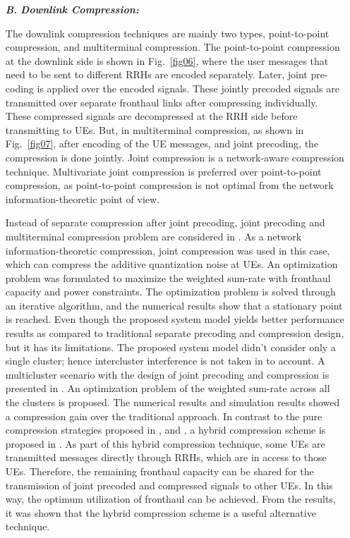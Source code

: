 \begin{multicols}{2}
\begin{itemize}

\item[{\textit{\textbf{ B.}}}] {\textit{\textbf{Downlink Compression:}}}

The downlink compression techniques are mainly two types, point-to-point compression, and multiterminal compression. The point-to-point compression at the downlink side is shown in Fig.~\ref{fig06}, where the user messages that need to be sent to different RRHs are encoded separately. Later, joint pre-coding is applied over the encoded signals. These jointly precoded signals are transmitted over separate fronthaul links after compressing individually. These compressed signals are decompressed at the RRH side before transmitting to UEs. But, in multiterminal compression, as shown in Fig.~\ref{fig07}, after encoding of the UE messages, and joint precoding, the compression is done jointly. Joint compression is a network-aware compression technique. Multivariate joint compression is preferred over point-to-point compression, as point-to-point compression is not optimal from the network information-theoretic point of view.

Instead of separate compression after joint precoding, joint precoding and multiterminal compression problem are considered in \cite{art3-key59}. As a network information-theoretic compression, joint compression was used in this case, which can compress the additive quantization noise at UEs. An optimization problem was formulated to maximize the weighted sum-rate with fronthaul capacity and power constraints. The optimization problem is solved through an iterative algorithm, and the numerical results show that a stationary point is reached. Even though the proposed system model yields better performance results as compared to traditional separate precoding and compression design, but it has its limitations. The proposed system model didn’t consider only a single cluster; hence intercluster interference is not taken in to account. A multicluster scenario with the design of joint precoding and compression is presented in \cite{art3-key60}. An optimization problem of the weighted sum-rate across all the clusters is proposed. The numerical results and simulation results showed a compression gain over the traditional approach. In contrast to the pure compression strategies proposed in \cite{art3-key59}, and \cite{art3-key60}, a hybrid compression scheme is proposed in \cite{art3-key61}. As part of this hybrid compression technique, some UEs are transmitted messages directly through RRHs, which are in access to those UEs. Therefore, the remaining fronthaul capacity can be shared for the transmission of joint precoded and compressed signals to other UEs. In this way, the optimum utilization of fronthaul can be achieved. From the results, it was shown that the hybrid compression scheme is a useful alternative technique. 


\end{itemize}
\end{multicols}
